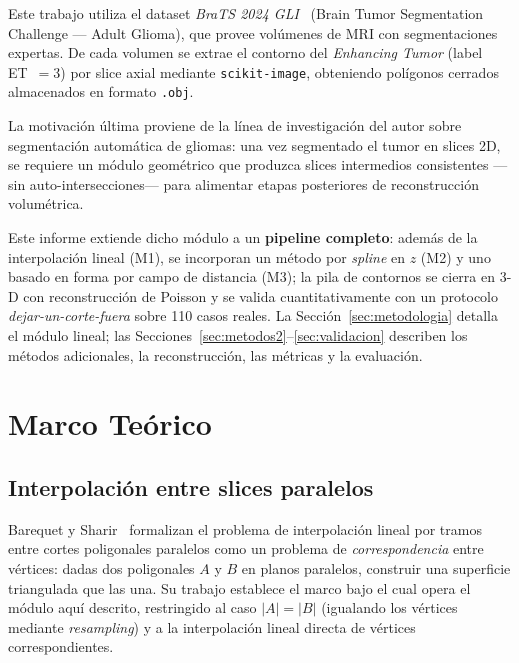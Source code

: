 \documentclass[conference]{IEEEtran}
\begin{document}
Este trabajo utiliza el dataset \textit{BraTS 2024
GLI}~\cite{baid2021brats} (Brain Tumor Segmentation Challenge
--- Adult Glioma), que provee volúmenes de MRI con
segmentaciones expertas. De cada volumen se extrae el contorno
del \textit{Enhancing Tumor} (label ET~$=3$) por slice axial
mediante \texttt{scikit-image}, obteniendo polígonos cerrados
almacenados en formato \texttt{.obj}.

La motivación última proviene de la línea de investigación del
autor sobre segmentación automática de gliomas: una vez
segmentado el tumor en slices 2D, se requiere un módulo
geométrico que produzca slices intermedios consistentes
---sin auto-intersecciones--- para alimentar etapas
posteriores de reconstrucción volumétrica.

Este informe extiende dicho módulo a un \textbf{pipeline completo}:
además de la interpolación lineal (M1), se incorporan un método por
\emph{spline} en $z$ (M2) y uno basado en forma por campo de distancia
(M3); la pila de contornos se cierra en 3-D con reconstrucción de
Poisson y se valida cuantitativamente con un protocolo
\emph{dejar-un-corte-fuera} sobre 110 casos reales. La
Sección~\ref{sec:metodologia} detalla el módulo lineal; las
Secciones~\ref{sec:metodos2}--\ref{sec:validacion} describen los
métodos adicionales, la reconstrucción, las métricas y la evaluación.

\section{Marco Teórico}
\label{sec:marco}

\subsection{Interpolación entre slices paralelos}
Barequet y Sharir~\cite{barequet1996} formalizan el problema
de interpolación lineal por tramos entre cortes poligonales
paralelos como un problema de \emph{correspondencia} entre
vértices: dadas dos poligonales $A$ y $B$ en planos paralelos,
construir una superficie triangulada que las una. Su trabajo
establece el marco bajo el cual opera el módulo aquí descrito,
restringido al caso $|A| = |B|$ (igualando los vértices mediante
\textit{resampling}) y a la interpolación lineal directa de
vértices correspondientes.
\end{document}
